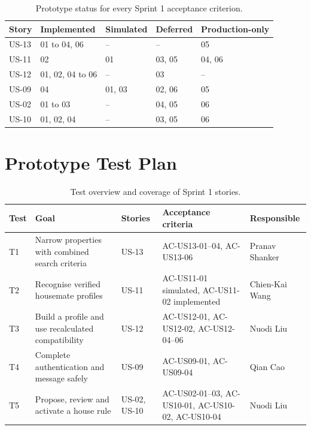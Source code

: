\documentclass[11pt,a4paper]{article}
\begin{document}
\begin{table}[H]
    \centering
    \footnotesize
    \caption{Prototype status for every Sprint 1 acceptance criterion.}
    \begin{tabularx}{\textwidth}{@{}L{1.2cm}Y Y Y Y@{}}
        \toprule
        Story & Implemented & Simulated & Deferred & Production-only\\
        \midrule
        US-13 & 01 to 04, 06 & -- & -- & 05\\
        US-11 & 02 & 01 & 03, 05 & 04, 06\\
        US-12 & 01, 02, 04 to 06 & -- & 03 & --\\
        US-09 & 04 & 01, 03 & 02, 06 & 05\\
        US-02 & 01 to 03 & -- & 04, 05 & 06\\
        US-10 & 01, 02, 04 & -- & 03, 05 & 06\\
        \bottomrule
    \end{tabularx}
    \label{tabprototypeacstatus}
\end{table}

\section{Prototype Test Plan}
\label{sectestplan}

\begin{table}[H]
    \centering
    \small
    \caption{Test overview and coverage of Sprint 1 stories.}
    \begin{tabularx}{\textwidth}{@{}L{0.9cm}Y L{1.9cm}L{3.6cm}L{1.9cm}@{}}
        \toprule
        Test & Goal & Stories & Acceptance criteria & Responsible\\
        \midrule
        T1 & Narrow properties with combined search criteria & US-13 & AC-US13-01--04, AC-US13-06 & Pranav Shanker\\
        T2 & Recognise verified housemate profiles & US-11 & AC-US11-01 simulated, AC-US11-02 implemented & Chien-Kai Wang\\
        T3 & Build a profile and use recalculated compatibility & US-12 & AC-US12-01, AC-US12-02, AC-US12-04--06 & Nuodi Liu\\
        T4 & Complete authentication and message safely & US-09 & AC-US09-01, AC-US09-04 & Qian Cao\\
        T5 & Propose, review and activate a house rule & US-02, US-10 & AC-US02-01--03, AC-US10-01, AC-US10-02, AC-US10-04 & Nuodi Liu\\
        \bottomrule
    \end{tabularx}
    \label{tabtestoverview}
\end{table}
\end{document}
